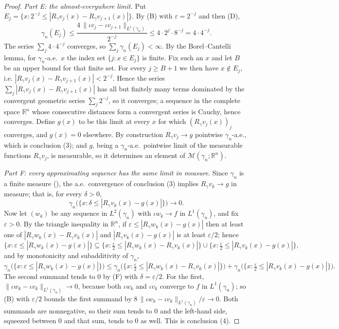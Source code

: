 \begin{proof}
\emph{Part E: the almost-everywhere limit.}
Put $E_j = \{x : 2^{-j} \leq |R_\gamma v_j(x) - R_\gamma v_{j+1}(x)|\}$.  By (B) with
$\varepsilon = 2^{-j}$ and then (D),
\[
  \gamma_n(E_j) \leq \frac{4\,\|\iota v_j - \iota v_{j+1}\|_{L^1(\gamma_n)}}{2^{-j}}
    \leq 4\cdot 2^{j}\cdot 8^{-j} = 4\cdot 4^{-j} .
\]
The series $\sum_j 4\cdot4^{-j}$ converges, so $\sum_j \gamma_n(E_j) < \infty$.  By the
Borel--Cantelli lemma, for $\gamma_n$-a.e.\ $x$ the index set $\{j : x \in E_j\}$ is
finite.  Fix such an $x$ and let $B$ be an upper bound for that finite set.  For every
$j \geq B+1$ we then have $x \notin E_j$, i.e.
$|R_\gamma v_j(x) - R_\gamma v_{j+1}(x)| < 2^{-j}$.  Hence the series
$\sum_j |R_\gamma v_j(x) - R_\gamma v_{j+1}(x)|$ has all but finitely many terms
dominated by the convergent geometric series $\sum_j 2^{-j}$, so it converges; a
sequence in the complete space $\mathbb{R}^n$ whose consecutive distances form a
convergent series is Cauchy, hence converges.  Define $g(x)$ to be this limit at every
$x$ for which $(R_\gamma v_j(x))_j$ converges, and $g(x) = 0$ elsewhere.  By
construction $R_\gamma v_j \to g$ pointwise $\gamma_n$-a.e., which is conclusion (3);
and $g$, being a $\gamma_n$-a.e.\ pointwise limit of the measurable functions
$R_\gamma v_j$, is measurable, so it determines an element of
$\mathcal{M}(\gamma_n;\mathbb{R}^n)$.

\emph{Part F: every approximating sequence has the same limit in measure.}
Since $\gamma_n$ is a finite measure (), the a.e.\ convergence of
conclusion (3) implies $R_\gamma v_k \to g$ in measure; that is, for every
$\delta > 0$,
\begin{equation*}
  \gamma_n\bigl(\{x : \delta \leq |R_\gamma v_k(x) - g(x)|\}\bigr) \longrightarrow 0 .
  \tag{F}
\end{equation*}
Now let $(w_k)$ be any sequence in $L^2(\gamma_n)$ with $\iota w_k \to f$ in
$L^1(\gamma_n)$, and fix $\varepsilon > 0$.  By the triangle inequality in
$\mathbb{R}^n$, if $\varepsilon \leq |R_\gamma w_k(x) - g(x)|$ then at least one of
$|R_\gamma w_k(x) - R_\gamma v_k(x)|$ and $|R_\gamma v_k(x) - g(x)|$ is at least
$\varepsilon/2$; hence
\[
  \{x : \varepsilon \leq |R_\gamma w_k(x) - g(x)|\}
    \subseteq \{x : \tfrac{\varepsilon}{2} \leq |R_\gamma w_k(x) - R_\gamma v_k(x)|\}
      \cup \{x : \tfrac{\varepsilon}{2} \leq |R_\gamma v_k(x) - g(x)|\} ,
\]
and by monotonicity and subadditivity of $\gamma_n$,
\[
  \gamma_n\bigl(\{x : \varepsilon \leq |R_\gamma w_k(x) - g(x)|\}\bigr)
    \leq \gamma_n\bigl(\{x : \tfrac{\varepsilon}{2}
          \leq |R_\gamma w_k(x) - R_\gamma v_k(x)|\}\bigr)
      + \gamma_n\bigl(\{x : \tfrac{\varepsilon}{2}
          \leq |R_\gamma v_k(x) - g(x)|\}\bigr) .
\]
The second summand tends to $0$ by (F) with $\delta = \varepsilon/2$.  For the first,
$\|\iota w_k - \iota v_k\|_{L^1(\gamma_n)} \to 0$, because both $\iota w_k$ and
$\iota v_k$ converge to $f$ in $L^1(\gamma_n)$; so (B) with $\varepsilon/2$ bounds the
first summand by
$8\,\|\iota w_k - \iota v_k\|_{L^1(\gamma_n)}/\varepsilon \to 0$.  Both summands are
nonnegative, so their sum tends to $0$ and the left-hand side, squeezed between $0$ and
that sum, tends to $0$ as well.  This is conclusion (4).
\end{proof}
